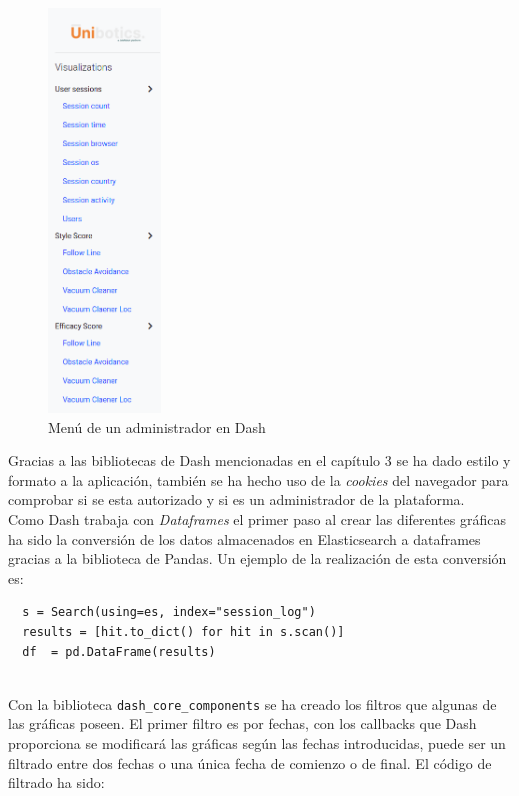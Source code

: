 \begin{figure}[H]
    \centering
    \includegraphics[width=3cm, keepaspectratio]{img/menu.png}
    \caption{Menú de un administrador en Dash}
    \label{fig:menu}
\end{figure}


Gracias a las bibliotecas de Dash mencionadas en el capítulo 3 se ha dado estilo y formato a la aplicación, también se ha hecho uso de la \textit{cookies }del navegador para comprobar si se esta autorizado y si es un administrador de la plataforma.\\

Como Dash trabaja con \textit{Dataframes} el primer paso al crear las diferentes gráficas ha sido la conversión de los datos almacenados en Elasticsearch a dataframes gracias a la biblioteca de Pandas. Un ejemplo de la realización de esta conversión es:

{\footnotesize
\begin{verbatim}
  s = Search(using=es, index="session_log")
  results = [hit.to_dict() for hit in s.scan()]
  df  = pd.DataFrame(results)
\end{verbatim}
}
\\

Con la biblioteca \texttt{dash\_core\_components} se ha creado los filtros que algunas de las gráficas poseen. El primer filtro es por fechas, con los callbacks que Dash proporciona se modificará las gráficas según las fechas introducidas, puede ser un filtrado entre dos fechas o una única fecha de comienzo o de final. El código de filtrado ha sido:

